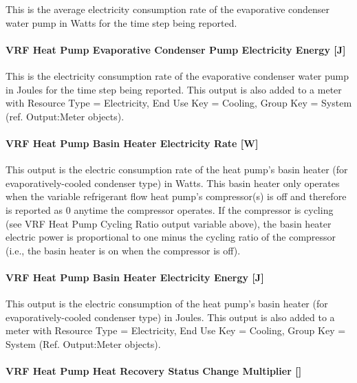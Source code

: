 This is the average electricity consumption rate of the evaporative condenser water pump in Watts for the time step being reported.

\paragraph{VRF Heat Pump Evaporative Condenser Pump Electricity Energy {[}J{]}}\label{vrf-heat-pump-evaporative-condenser-pump-electric-energy-j}

This is the electricity consumption rate of the evaporative condenser water pump in Joules for the time step being reported. This output is also added to a meter with Resource Type = Electricity, End Use Key = Cooling, Group Key = System (ref. Output:Meter objects).

\paragraph{VRF Heat Pump Basin Heater Electricity Rate {[}W{]}}\label{vrf-heat-pump-basin-heater-electric-power-w}

This output is the electric consumption rate of the heat pump's basin heater (for evaporatively-cooled condenser type) in Watts. This basin heater only operates when the variable refrigerant flow heat pump's compressor(s) is off and therefore is reported as 0 anytime the compressor operates. If the compressor is cycling (see VRF Heat Pump Cycling Ratio output variable above), the basin heater electric power is proportional to one minus the cycling ratio of the compressor (i.e., the basin heater is on when the compressor is off).

\paragraph{VRF Heat Pump Basin Heater Electricity Energy {[}J{]}}\label{vrf-heat-pump-basin-heater-electric-energy-j}

This output is the electric consumption of the heat pump's basin heater (for evaporatively-cooled condenser type) in Joules. This output is also added to a meter with Resource Type = Electricity, End Use Key = Cooling, Group Key = System (Ref. Output:Meter objects).

\paragraph{\texorpdfstring{VRF Heat Pump Heat Recovery Status Change Multiplier {[]}}{VRF Heat Pump Heat Recovery Status Change Multiplier }}\label{vrf-heat-pump-heat-recovery-status-change-multiplier}

